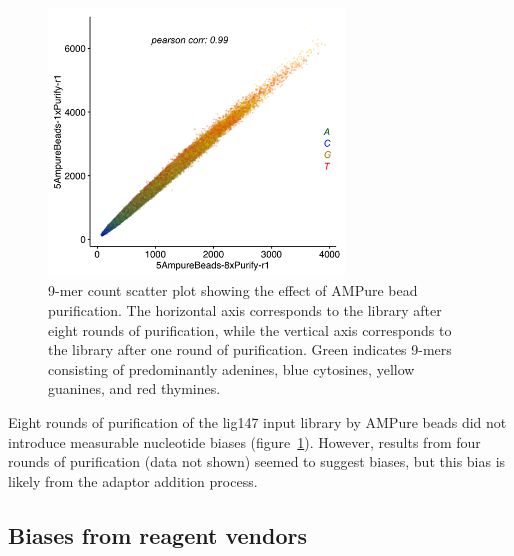 \documentclass[parskip=full, numbers=noenddot]{scrreprt}
\begin{document}
\begin{figure}[htpb]
  \centering
  \includegraphics[width=0.7\textwidth]{kmer_ampure}
  \caption{9-mer count scatter plot showing the effect of AMPure bead purification.  The horizontal axis corresponds to the library after eight rounds of purification, while the vertical axis corresponds to the library after one round of purification.  Green indicates 9-mers consisting of predominantly adenines, blue cytosines, yellow guanines, and red thymines.}
  \label{fig:kmer_pur}
\end{figure}

Eight rounds of purification of the lig147 input library by AMPure beads did not introduce measurable nucleotide biases (figure~\ref{fig:kmer_pur}).  However, results from four rounds of purification (data not shown) seemed to suggest biases, but this bias is likely from the adaptor addition process. %

\subsection{Biases from reagent vendors}
\label{ssec:pcrbias_result_reagent}
\end{document}
